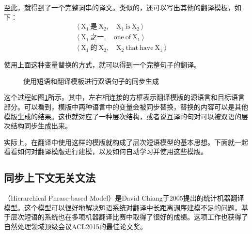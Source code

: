 \parinterval 至此，就得到了一个完整词串的译文。类似的，还可以写出其他的翻译模板，如下：
\begin{eqnarray}
\langle \ \textrm{X}_1\ \text{是}\ \textrm{X}_2,\quad \textrm{X}_1\ \textrm{is}\ \textrm{X}_2 \ \rangle \qquad\qquad\ \nonumber \\
\langle \ \textrm{X}_1\ \text{之一},\quad \textrm{one}\ \textrm{of}\ \textrm{X}_1 \ \rangle \qquad\qquad\ \nonumber \\
\langle \ \textrm{X}_1\ \text{的}\ \textrm{X}_2,\quad \textrm{X}_2\ \textrm{that}\ \textrm{have}\ \textrm{X}_1\ \rangle\quad\ \nonumber
\end{eqnarray}

\parinterval 使用上面这种变量替换的方式，就可以得到一个完整句子的翻译。

\begin{figure}[htp]
\centering

\caption{使用短语和翻译模板进行双语句子的同步生成}
\label{fig:4-32}
\end{figure}

\parinterval 这个过程如图\ref{fig:4-32}所示。其中，左右相连接的方框表示翻译模版的源语言和目标语言部分。可以看到，模版中两种语言中的变量会被同步替换，替换的内容可以是其他模版生成的结果。这也就对应了一种层次结构，或者说互译的句对可以被双语的层次结构同步生成出来。

\parinterval 实际上，在翻译中使用这样的模版就构成了层次短语模型的基本思想。下面就一起看看如何对翻译模版进行建模，以及如何自动学习并使用这些模版。


\subsection{同步上下文无关文法}

（Hierarchical Phrase-based Model）是David Chiang于2005提出的统计机器翻译模型\cite{chiang2005a,chiang2007hierarchical}。这个模型可以很好地解决短语系统对翻译中长距离调序建模不足的问题。基于层次短语的系统也在多项机器翻译比赛中取得了很好的成绩。这项工作也获得了自然处理领域顶级会议ACL2015的最佳论文奖。


